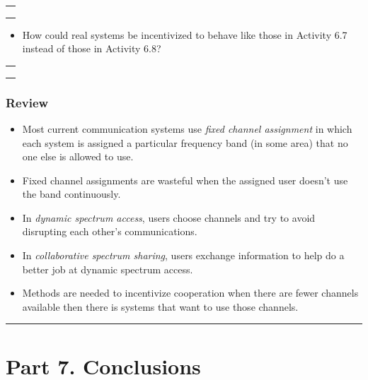 \documentclass[11pt]{article}
\providecommand{\tightlist}{%
      \setlength{\itemsep}{0pt}\setlength{\parskip}{0pt}}
\begin{document}
\begin{longtable}[]{@{}l@{}}
\toprule
 \\
\midrule
\endhead
 \\
 \\
 \\
\bottomrule
\end{longtable}

\begin{itemize}
\tightlist
\item
  How could real systems be incentivized to behave like those in
  Activity 6.7 instead of those in Activity 6.8?
\end{itemize}

\begin{longtable}[]{@{}l@{}}
\toprule
 \\
\midrule
\endhead
 \\
 \\
 \\
\bottomrule
\end{longtable}

    \hypertarget{review}{%
\subsubsection*{Review}\label{review}}

\begin{itemize}
\tightlist
\item
  Most current communication systems use \emph{fixed channel assignment}
  in which each system is assigned a particular frequency band (in some
  area) that no one else is allowed to use.
\item
  Fixed channel assignments are wasteful when the assigned user doesn't
  use the band continuously.
\item
  In \emph{dynamic spectrum access}, users choose channels and try to
  avoid disrupting each other's communications.
\item
  In \emph{collaborative spectrum sharing}, users exchange information
  to help do a better job at dynamic spectrum access.
\item
  Methods are needed to incentivize cooperation when there are fewer
  channels available then there is systems that want to use those
  channels.
\end{itemize}

    \begin{center}\rule{\linewidth}{0.5pt}\end{center}

\hypertarget{part-7.-conclusions}{%
\section*{Part 7. Conclusions}\label{part-7.-conclusions}}
\end{document}
